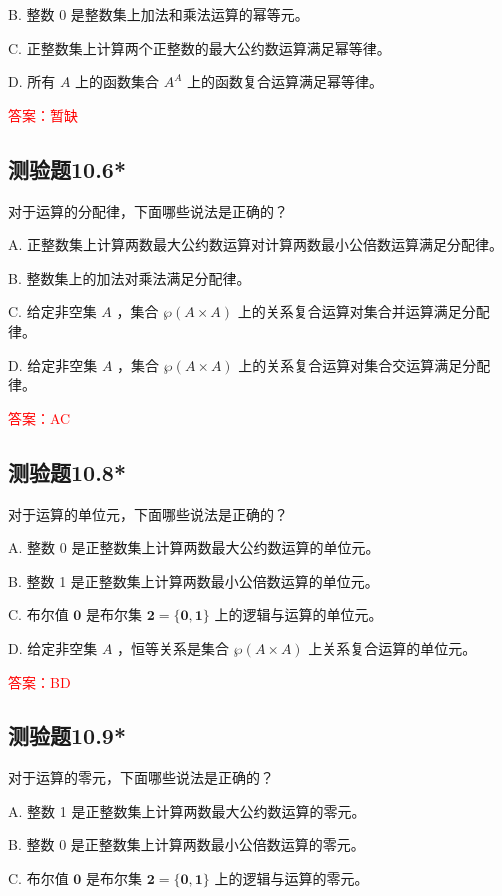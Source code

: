 \documentclass[UTF8, heading=true]{ctexart}
\begin{document}
B. 整数 0 是整数集上加法和乘法运算的幂等元。

C. 正整数集上计算两个正整数的最大公约数运算满足幂等律。

D. 所有 $A$ 上的函数集合 $A^A$ 上的函数复合运算满足幂等律。

\textcolor{red}{答案：暂缺}

\subsection{测验题10.6*}

对于运算的分配律，下面哪些说法是正确的？

A. 正整数集上计算两数最大公约数运算对计算两数最小公倍数运算满足分配律。

B. 整数集上的加法对乘法满足分配律。

C. 给定非空集 $A$ ，集合 $\wp(A \times A)$ 上的关系复合运算对集合并运算满足分配律。

D. 给定非空集 $A$ ，集合 $\wp(A \times A)$ 上的关系复合运算对集合交运算满足分配律。

\textcolor{red}{答案：AC}

\subsection{测验题10.8*}

对于运算的单位元，下面哪些说法是正确的？

A. 整数 0 是正整数集上计算两数最大公约数运算的单位元。

B. 整数 1 是正整数集上计算两数最小公倍数运算的单位元。

C. 布尔值 $\mathbf{0}$ 是布尔集 $\mathbf{2}=\{\mathbf{0}, \mathbf{1}\}$ 上的逻辑与运算的单位元。

D. 给定非空集 $A$ ，恒等关系是集合 $\wp(A \times A)$ 上关系复合运算的单位元。

\textcolor{red}{答案：BD}

\subsection{测验题10.9*}

对于运算的零元，下面哪些说法是正确的？

A. 整数 1 是正整数集上计算两数最大公约数运算的零元。

B. 整数 0 是正整数集上计算两数最小公倍数运算的零元。

C. 布尔值 $\mathbf{0}$ 是布尔集 $\mathbf{2}=\{\mathbf{0}, \mathbf{1}\}$ 上的逻辑与运算的零元。
\end{document}
